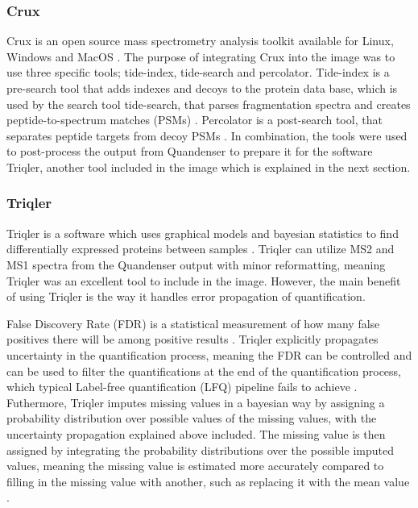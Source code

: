 \subsubsection{Crux}
Crux is an open source mass spectrometry analysis toolkit available for Linux, Windows and MacOS \cite{crux}. The purpose of integrating Crux into the image was to use three specific tools; tide-index, tide-search and percolator. Tide-index is a pre-search tool that adds indexes and decoys to the protein data base, which is used by the search tool tide-search, that parses fragmentation spectra and creates peptide-to-spectrum matches (PSMs) \cite{tide-search}. Percolator is a post-search tool, that separates peptide targets from decoy PSMs \cite{percolator}. In combination, the tools were used to post-process the output from Quandenser to prepare it for the software Triqler, another tool included in the image which is explained in the next section.

\subsubsection{Triqler}  \label{ssec:triqler}
Triqler is a software which uses graphical models and bayesian statistics to find differentially expressed proteins between samples \cite{triqler}. Triqler can utilize MS2 and MS1 spectra from the Quandenser output with minor reformatting, meaning Triqler was an excellent tool to include in the image. However, the main benefit of using Triqler is the way it handles error propagation of quantification.

False Discovery Rate (FDR) is a statistical measurement of how many false positives there will be among positive results \cite{fdr}.  Triqler explicitly propagates uncertainty in the quantification process, meaning the FDR can be controlled and can be used to filter the quantifications at the end of the quantification process, which typical Label-free quantification (LFQ) pipeline fails to achieve \cite{triqler}. Futhermore, Triqler imputes missing values in a bayesian way by assigning a probability distribution over possible values of the missing values, with the uncertainty propagation explained above included. The missing value is then assigned by integrating the probability distributions over the possible imputed values, meaning the missing value is estimated more accurately compared to filling in the missing value with another, such as replacing it with the mean value \cite{triqler}.

